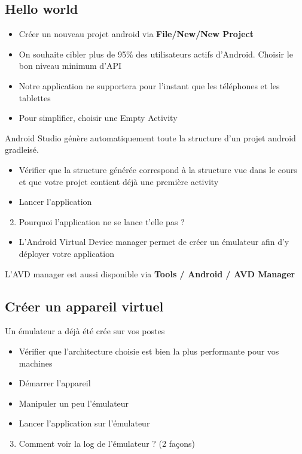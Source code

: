 \documentclass{article}
\begin{document}
\subsection{Hello world}
\begin{itemize}
\item Créer un nouveau projet android via \textbf{File/New/New Project}
\item On souhaite cibler plus de 95\% des utilisateurs actifs d'Android. Choisir
le bon niveau minimum d'API
\item Notre application ne supportera pour l'instant que les téléphones et les
tablettes
\item Pour simplifier, choisir une Empty Activity
\end{itemize}
Android Studio génère automatiquement toute la structure d'un projet android
gradleisé.
\begin{itemize}
\item Vérifier que la structure générée correspond à la structure vue dans le
cours et que votre projet contient déjà une première activity
\item Lancer l'application
\end{itemize}
\begin{enumerate}
 \setcounter{enumi}{1}
\item Pourquoi l'application ne se lance t'elle pas ?
\end{enumerate}
\begin{itemize}
\item L'Android Virtual Device manager permet de créer un émulateur afin d'y
déployer votre application
\end{itemize}
L'AVD manager est aussi disponible via \textbf{Tools / Android / AVD Manager}
\subsection{Créer un appareil virtuel}
Un émulateur a déjà été crée sur vos postes
\begin{itemize}
\item Vérifier que l'architecture choisie est bien la plus performante pour vos
machines
\item Démarrer l'appareil
\item Manipuler un peu l'émulateur
\item Lancer l'application sur l'émulateur
\end{itemize}
\begin{enumerate}
 \setcounter{enumi}{2}
\item Comment voir la log de l'émulateur ? (2 façons)
\end{enumerate}
\end{document}
